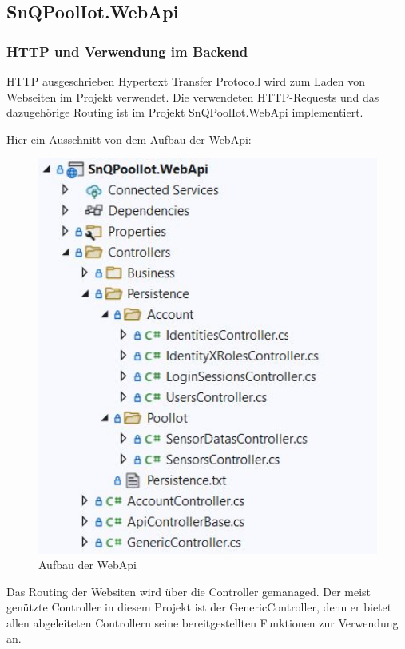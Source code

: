 \subsection{SnQPoolIot.WebApi}

\subsubsection*{HTTP und Verwendung im Backend}

HTTP ausgeschrieben Hypertext Transfer Protocoll wird zum Laden von Webseiten im Projekt verwendet.
Die verwendeten HTTP-Requests und das dazugehörige Routing ist im Projekt SnQPoolIot.WebApi implementiert.

Hier ein Ausschnitt von dem Aufbau der WebApi:

\begin{figure}[H]
    \centering
    \includegraphics[width=1\textwidth]{pics/HTTPRequestsWebApi.JPG}
    \caption{Aufbau der WebApi}
\end{figure}


Das Routing der Websiten wird über die Controller gemanaged. 
Der meist genützte Controller in diesem Projekt ist der GenericController, denn er bietet allen abgeleiteten Controllern seine bereitgestellten Funktionen zur Verwendung an.

